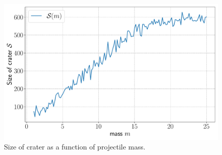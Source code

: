 \begin{figure}
	\centering
	\includegraphics[width=\columnwidth]{../fig/mass_size}
	\caption{Size of crater as a function of projectile mass.}
	\label{fig:mass_size}
\end{figure}